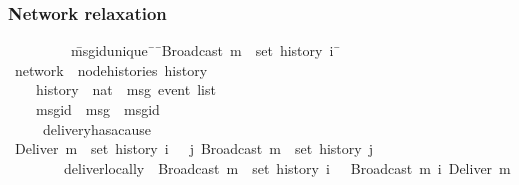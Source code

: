 \documentclass[aspectratio=169,compress,handout]{beamer}
\renewenvironment{isabelle}{%
  \medbreak\noindent\hspace{\parindent}%
  \begin{minipage}{\textwidth}%
  \begin{isabellebody}%
  \begin{tabbing}%
}{%
  \end{tabbing}%
  \end{isabellebody}%
  \end{minipage}%
  \medbreak%
}
\begin{document}
  \begin{frame}
    \frametitle{Network relaxation}

    \begin{isabelle}
    ~~~~~~~~\ \=msg{\isacharunderscore}id{\isacharunderscore}unique{\isacharcolon}\ \={\isasymrbrakk}\ \={\isachardoublequoteopen}Broadcast\ m\ {\isasymin}\ set\ {\isacharparenleft}history\ i{\isacharparenright}\ \=\kill
    \ network\ {\isacharequal}\ node{\isacharunderscore}histories\ history\\
    ~~~~\>history\ {\isacharcolon}{\isacharcolon}\ {\isachardoublequoteopen}nat\ {\isasymRightarrow}\ {\isacharprime}msg\ event\ list{\isachardoublequoteclose}\ {\isacharplus}\\
    ~~~~\>msg{\isacharunderscore}id\ {\isacharcolon}{\isacharcolon}\ {\isachardoublequoteopen}{\isacharprime}msg\ {\isasymRightarrow}\ {\isacharprime}msgid{\isachardoublequoteclose}\\
    ~~~~\ delivery{\isacharunderscore}has{\isacharunderscore}a{\isacharunderscore}cause{\isacharcolon}\\
    \>\>{\isasymlbrakk}\ {\isachardoublequoteopen}Deliver\ m\ {\isasymin}\ set\ {\isacharparenleft}history\ i{\isacharparenright}\ \>\>{\isasymrbrakk}\ {\isasymLongrightarrow}\ {\isasymexists}j{\isachardot}\ Broadcast\ m\ {\isasymin}\ set\ {\isacharparenleft}history\ j{\isacharparenright}{\isachardoublequoteclose}\\
    ~~~~~~~~\>deliver{\isacharunderscore}locally{\isacharcolon}\ \>{\isasymlbrakk}\ \>{\isachardoublequoteopen}Broadcast\ m\ {\isasymin}\ set\ {\isacharparenleft}history\ i{\isacharparenright}\ \>{\isasymrbrakk}\ {\isasymLongrightarrow}\  Broadcast\ m\ {\isasymsqsubset}\isactrlsup i\ Deliver\ m{\isachardoublequoteclose}\\
    \end{isabelle}
    \pause
  \end{frame}
\end{document}
